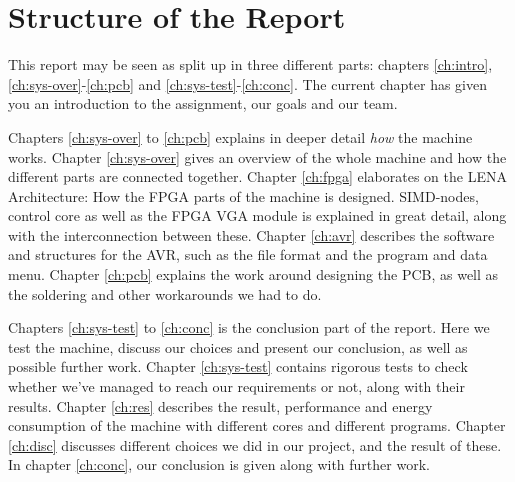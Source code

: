 \section{Structure of the Report}

This report may be seen as split up in three different parts: chapters
\ref{ch:intro}, \ref{ch:sys-over}-\ref{ch:pcb} and
\ref{ch:sys-test}-\ref{ch:conc}.  The
current chapter has given you an introduction to the assignment, our goals and
our team. 

Chapters \ref{ch:sys-over} to \ref{ch:pcb} explains in deeper detail {\em how}
the machine works. Chapter \ref{ch:sys-over} gives an
overview of the whole machine and how the different parts are connected
together. Chapter \ref{ch:fpga} elaborates on the LENA Architecture: How the
FPGA parts of the machine is designed. SIMD-nodes, control core as well as the
FPGA VGA module is explained in great detail, along with the interconnection
between these. Chapter \ref{ch:avr} describes the software and structures for
the AVR, such as the file format and the program and data menu. Chapter
\ref{ch:pcb} explains the work around designing the PCB, as well as the
soldering and other workarounds we had to do.

Chapters \ref{ch:sys-test} to \ref{ch:conc} is the conclusion part of the
report. Here we test the machine, discuss our choices and present our
conclusion, as well as possible further work. Chapter \ref{ch:sys-test} contains
rigorous tests to check whether we've managed to reach our requirements or not,
along with their results. Chapter \ref{ch:res} describes the result, performance
and energy consumption of the machine with different cores and different
programs. Chapter \ref{ch:disc} discusses different choices we did in our
project, and the result of these. In chapter \ref{ch:conc}, our conclusion is
given along with further work.
